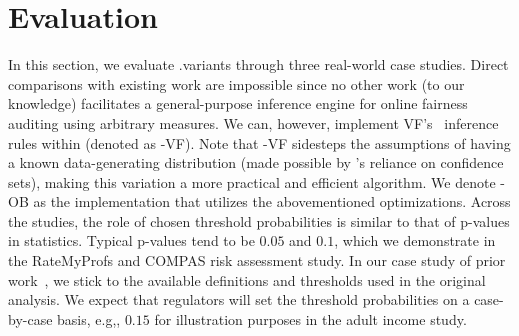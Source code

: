 \section{Evaluation}
\label{sec:casestudy}
In this section, we evaluate \AVOIRmethodname{}.variants through three real-world case studies.
Direct comparisons with existing work are impossible since no other work (to our knowledge) facilitates a general-purpose inference engine for online fairness auditing using arbitrary measures.
We can, however, implement VF's~\cite{bastani2019probabilistic} inference rules within \AVOIRmethodname{} (denoted as \AVOIRmethodname{}-VF).
Note that \AVOIRmethodname{}-VF sidesteps the assumptions of having a known data-generating distribution (made possible by \AVOIRmethodname{}'s reliance on confidence sets), making this variation a more practical and efficient algorithm. 
We denote \AVOIRmethodname{}-OB as the implementation that utilizes the abovementioned optimizations. 
Across the studies, the role of chosen threshold probabilities is similar to that of p-values in statistics.
Typical p-values tend to be $0.05$ and $0.1$, which we demonstrate in the RateMyProfs and COMPAS risk assessment study. 
In our case study of prior work~\cite{angwin2016machine}, we stick to the available definitions and thresholds used in the original analysis.
We expect that regulators will set the threshold probabilities on a case-by-case basis, e.g,, $0.15$ for illustration purposes in the adult income study.%

